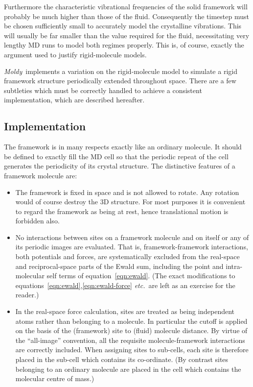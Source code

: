 \documentclass[a4paper,twoside]{report}
\newcommand{\moldy}{\emph{Moldy}}
\newcommand{\etc}{\emph{etc.}}
\begin{document}
Furthermore the characteristic vibrational frequencies of the solid
framework will probably be much higher than those of the fluid.
Consequently the timestep must be chosen sufficiently small to
accurately model the crystalline vibrations.  This will usually be far
smaller than the value required for the fluid, necessitating very
lengthy MD runs to model both regimes properly.  This is, of course,
exactly the argument used to justify rigid-molecule models. 

\moldy\ implements a variation on the rigid-molecule model to simulate
a rigid framework structure periodically extended throughout space.
There are a few subtleties which must be correctly handled to achieve
a consistent implementation, which are described hereafter.  

\subsection{Implementation}
The framework is in many respects exactly like an ordinary molecule.
It should be defined to exactly fill the MD cell so that the
periodic repeat of the cell generates the periodicity of its
crystal structure.  The distinctive features of a framework molecule are:
\begin{itemize}
\item The framework is fixed in space and is not allowed to rotate. 
Any rotation would of course destroy the 3D structure.  For most
purposes it is convenient to regard the framework as being at rest, hence
translational motion is forbidden also.
\item No interactions between sites on a framework molecule and on itself
or any of its periodic images are evaluated.  That is,
framework-framework interactions, both potentials and forces, are
systematically excluded from the real-space and reciprocal-space parts
of the Ewald sum, including the point and intra-molecular self terms
of equation~\ref{eqn:ewald}. (The exact modifications to
equations~\ref{eqn:ewald},\ref{eqn:ewald-force} \etc\ are left as an
exercise for the reader.)
\item In the real-space force calculation, sites are treated as being
independent atoms rather than belonging to a molecule.  In particular
the cutoff is applied on the basis of the (framework) site to (fluid)
molecule distance.  By virtue of the ``all-image'' convention, all the
requisite molecule-framework interactions are correctly
included.  When assigning sites to sub-cells, each site is therefore
placed in the sub-cell which contains its co-ordinate.  (By contrast
sites belonging to an ordinary molecule are placed in the cell which
contains the molecular centre of mass.)
\end{itemize}
\end{document}
